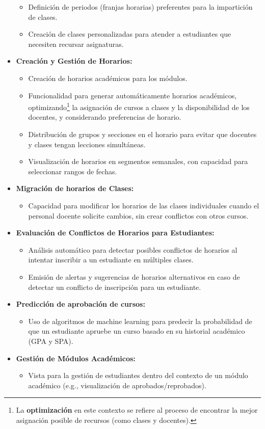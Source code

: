 \begin{itemize}
\begin{itemize}
	\item Definición de periodos (franjas horarias) preferentes para la impartición de clases.
	\item Creación de clases personalizadas para atender a estudiantes que necesiten recursar asignaturas.
    \end{itemize}
\item \textbf{Creación y Gestión de Horarios:}
    \begin{itemize}
	\item Creación de horarios académicos para los módulos.
	\item Funcionalidad para generar automáticamente horarios académicos, optimizando\footnote{La \textbf{optimización} en este contexto se refiere al proceso de encontrar la mejor asignación posible de recursos (como clases y docentes).} la asignación de cursos a clases y la disponibilidad de los docentes, y considerando preferencias de horario.
	\item Distribución de grupos y secciones en el horario para evitar que docentes y clases tengan lecciones simultáneas.
	\item Visualización de horarios en segmentos semanales, con capacidad para seleccionar rangos de fechas.
    \end{itemize}
\item \textbf{Migración de horarios de Clases:}
    \begin{itemize}
	\item Capacidad para modificar los horarios de las clases individuales cuando el personal docente solicite cambios, sin crear conflictos con otros cursos.
    \end{itemize}
\item \textbf{Evaluación de Conflictos de Horarios para Estudiantes:}
    \begin{itemize}
	\item Análisis automático para detectar posibles conflictos de horarios al intentar inscribir a un estudiante en múltiples clases.
	\item Emisión de alertas y sugerencias de horarios alternativos en caso de detectar un conflicto de inscripción para un estudiante.
    \end{itemize}
\item \textbf{Predicción de aprobación de cursos:}
    \begin{itemize}
	\item Uso de algoritmos de machine learning para predecir la probabilidad de que un estudiante apruebe un curso basado en su historial académico (GPA y SPA).
    \end{itemize}
\item \textbf{Gestión de Módulos Académicos:}
    \begin{itemize}
	\item Vista para la gestión de estudiantes dentro del contexto de un módulo académico (e.g., visualización de aprobados/reprobados).
	\end{itemize}
    \end{itemize}

